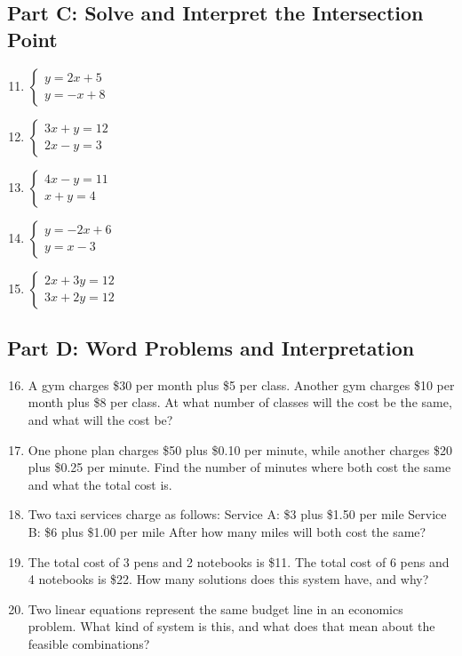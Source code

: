 \documentclass[14pt]{extarticle}
\begin{document}
\subsection*{Part C: Solve and Interpret the Intersection Point}
\begin{enumerate}
    \setcounter{enumi}{10}
    \item \(\begin{cases} y = 2x + 5 \\ y = -x + 8 \end{cases}\)
    \item \(\begin{cases} 3x + y = 12 \\ 2x - y = 3 \end{cases}\)
    \item \(\begin{cases} 4x - y = 11 \\ x + y = 4 \end{cases}\)
    \item \(\begin{cases} y = -2x + 6 \\ y = x - 3 \end{cases}\)
    \item \(\begin{cases} 2x + 3y = 12 \\ 3x + 2y = 12 \end{cases}\)
\end{enumerate}

\subsection*{Part D: Word Problems and Interpretation}
\begin{enumerate}
    \setcounter{enumi}{15}
    \item A gym charges \$30 per month plus \$5 per class. Another gym charges \$10 per month plus \$8 per class. At what number of classes will the cost be the same, and what will the cost be?
    \item One phone plan charges \$50 plus \$0.10 per minute, while another charges \$20 plus \$0.25 per minute. Find the number of minutes where both cost the same and what the total cost is.
    \item Two taxi services charge as follows:  
    Service A: \$3 plus \$1.50 per mile  
    Service B: \$6 plus \$1.00 per mile  
    After how many miles will both cost the same?
    \item The total cost of 3 pens and 2 notebooks is \$11. The total cost of 6 pens and 4 notebooks is \$22. How many solutions does this system have, and why?
    \item Two linear equations represent the same budget line in an economics problem. What kind of system is this, and what does that mean about the feasible combinations?
\end{enumerate}
\end{document}
